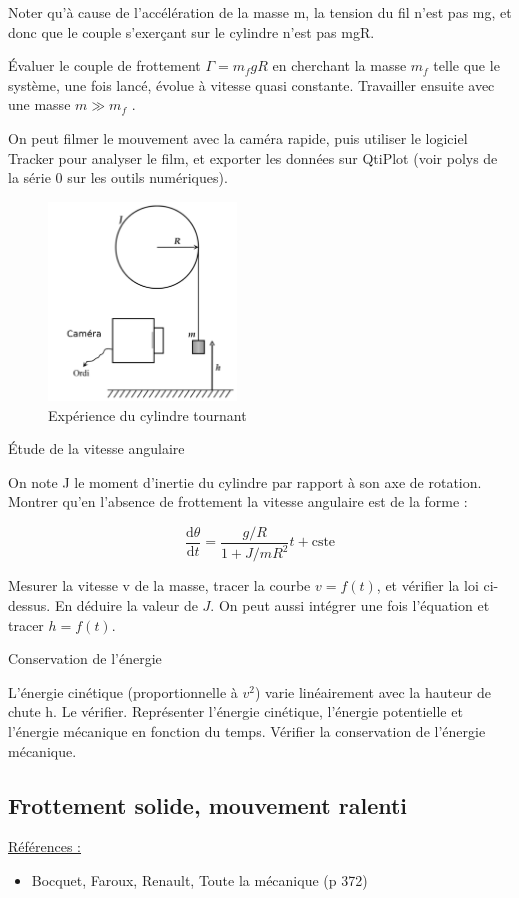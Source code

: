 \documentclass{article}%
\begin{document}
Noter qu'à cause de l'accélération de la masse m, la tension du fil n'est pas mg, et donc que le couple s'exerçant sur le cylindre n'est pas mgR.

    Évaluer le couple de frottement $\Gamma = m_{f} g R$ en cherchant la masse $m_{f}$ telle que le système, une fois lancé, évolue à vitesse quasi constante.
    Travailler ensuite avec une masse $m \gg m_{f}$ .

On peut filmer le mouvement avec la caméra rapide, puis utiliser le logiciel Tracker pour analyser le film, et exporter les données sur QtiPlot (voir polys de la série 0 sur les outils numériques).

\begin{figure}
      \centerline{\includegraphics[width=5cm]{images-exp/MecaCylindreTournant.png}}
 \caption{Expérience du cylindre tournant}
\end{figure}


Étude de la vitesse angulaire

    On note J le moment d'inertie du cylindre par rapport à son axe de rotation. Montrer qu'en l'absence de frottement la vitesse angulaire est de la forme :

    \[ \frac{\mathrm{d}\theta }{\mathrm{d}t} = \frac{g / R}{1 + J/mR^2} t + \mathrm{cste}\]

    Mesurer la vitesse v de la masse, tracer la courbe $v = f(t)$, et vérifier la loi ci-dessus. En déduire la valeur de $J$. On peut aussi intégrer une fois l'équation et tracer $h = f(t)$.

Conservation de l'énergie

L'énergie cinétique (proportionnelle à $v^2$) varie linéairement avec la hauteur de chute h. Le vérifier. Représenter l'énergie cinétique, l'énergie potentielle et l'énergie mécanique en fonction du temps. Vérifier la conservation de l'énergie mécanique. 

\subsection{Frottement solide, mouvement ralenti}
\underline{Références :}
\begin{itemize}
\item Bocquet, Faroux, Renault, Toute la mécanique (p 372)
\end{itemize}
\end{document}
